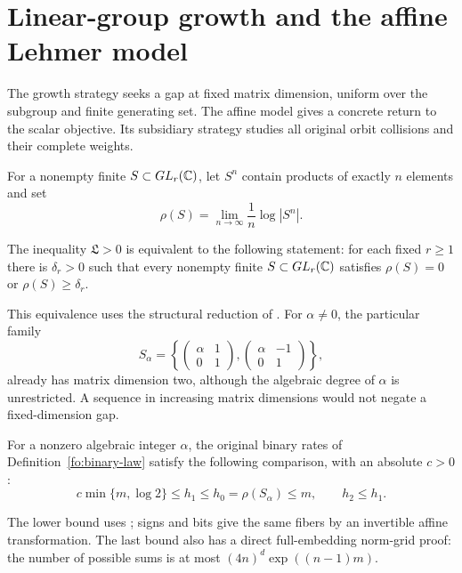 \section{Linear-group growth and the affine Lehmer model}
\label{sec:growth}

The growth strategy seeks a gap at fixed matrix dimension, uniform over the subgroup and finite generating set.
The affine model gives a concrete return to the scalar objective.
Its subsidiary strategy studies all original orbit collisions and their complete weights.

\begin{definition}\label{gr:word-growth}
For a nonempty finite $S\subset GL_r(\mathbb C)$, let $S^n$ contain products of exactly $n$ elements and set
\[
 \rho(S)=\lim_{n\to\infty}\frac1n\log|S^n|.
\]
\end{definition}
\begin{proposition}\label{gr:gap-equivalence}
The inequality $\mathfrak L>0$ is equivalent to the following statement:
for each fixed $r\ge1$ there is $\delta_r>0$ such that every nonempty finite $S\subset GL_r(\mathbb C)$ satisfies $\rho(S)=0$ or $\rho(S)\ge\delta_r$.
\end{proposition}
This equivalence uses the structural reduction of \citet[Theorem~4]{BV20}.
For $\alpha\ne0$, the particular family
\[
 S_\alpha=\left\{
 \begin{pmatrix}\alpha&1\\0&1\end{pmatrix},
 \begin{pmatrix}\alpha&-1\\0&1\end{pmatrix}\right\},
\]
already has matrix dimension two, although the algebraic degree of $\alpha$ is unrestricted.
A sequence in increasing matrix dimensions would not negate a fixed-dimension gap.

\begin{proposition}\label{gr:entropy-comparison}
For a nonzero algebraic integer $\alpha$, the original binary rates of Definition~\ref{fo:binary-law} satisfy the following comparison, with an absolute $c>0$:
\begin{equation}\label{fo:entropy-order}
 c\min\{m,\log2\}\le h_1\le h_0=\rho(S_\alpha)\le m,
 \qquad h_2\le h_1.
\end{equation}
\end{proposition}
The lower bound uses \cite[Theorem~5]{BV20}; signs and bits give the same fibers by an invertible affine transformation.
The last bound also has a direct full-embedding norm-grid proof: the number of possible sums is at most $(4n)^d\exp((n-1)m)$.


